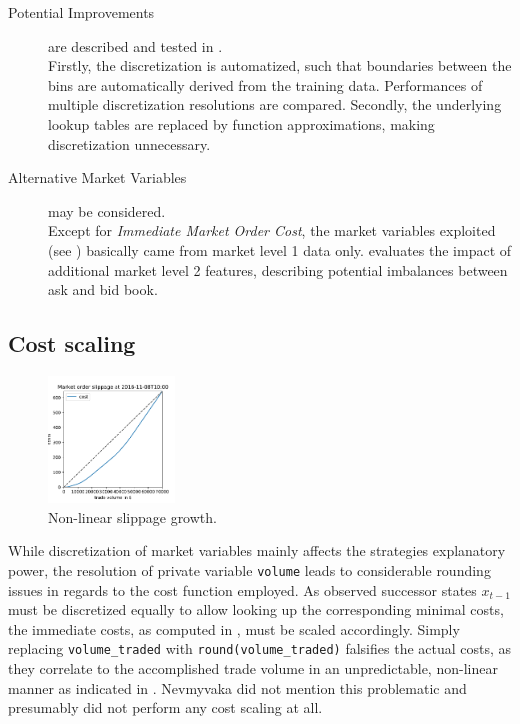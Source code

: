 \begin{description}
\item[Potential Improvements] are described and tested in .\\
Firstly, the discretization is automatized, such that boundaries between the bins are automatically derived from the training data. Performances of multiple discretization resolutions are compared. Secondly, the underlying lookup tables are replaced by function approximations, making discretization unnecessary.
\item[Alternative Market Variables] may be considered.\\
Except for \emph{Immediate Market Order Cost}, the market variables exploited (see ) basically came from market level 1 data only.  evaluates the impact of additional market level 2 features, describing potential imbalances between ask and bid book.
\end{description}



\subsection{Cost scaling}
\label{chap:backwardalgorithm:discussion:costscaling}
\begin{figure}
	\centering
	\includegraphics[width=0.3\textwidth]{content/drawings/nonlinearcosts}
	\caption{Non-linear slippage growth.}
	\label{fig:nonlinearcosts}
\end{figure}
While discretization of market variables mainly affects the strategies explanatory power, the resolution of private variable \lstinline!volume! leads to considerable rounding issues in regards to the cost function employed. As observed successor states $x_{t-1}$ must be discretized equally to allow looking up the corresponding minimal costs, the immediate costs, as computed in , must be scaled accordingly. Simply replacing \lstinline!volume_traded! with \lstinline!round(volume_traded)! falsifies the actual costs, as they correlate to the accomplished trade volume in an  unpredictable, non-linear manner as indicated in . Nevmyvaka \etal \Cite{Nevmyvaka:2006} did not mention this problematic and presumably did not perform any cost scaling at all.

